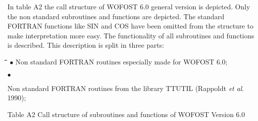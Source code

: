 In table A2 the call structure of WOFOST 6.0 general version is depicted. Only the non
standard subroutines and functions are depicted. The standard FOR\-TRAN functions like
SIN and COS have been omitted from the structure to make interpre\-tation more easy. The
functionality of all subroutines and functions is described. This description is split in three
parts:\nwln
\begin{tabbing}
\hspace{1.27cm}\=\hspace{1.27cm}\=\hspace{1.27cm}\=\hspace{1.27cm}\=%
\hspace{1.27cm}\=\hspace{1.27cm}\=\hspace{1.27cm}\=\hspace{1.27cm}\=%
\hspace{1.27cm}\=\hspace{1.27cm}\=\kill
$\bullet$\> Non standard FORTRAN routines especially made for WOFOST 6.0;
\end{tabbing}
$\bullet$ 
\testlastline

\begin{indenting}{1.27cm}
Non standard FORTRAN routines from the library TTUTIL (Rappoldt {\it et al\/}.
1990);
\end{indenting}

\bigskip
Table A2 Call structure of subroutines and functions of WOFOST Version 6.0

